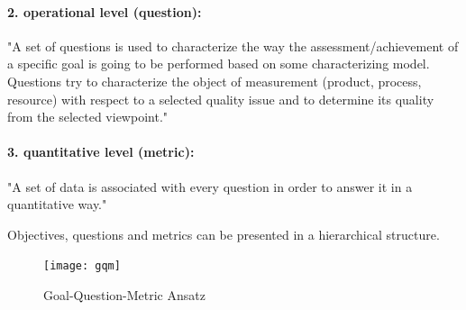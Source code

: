 \paragraph{2. operational level (question):}
"A set of questions is used to characterize the way
the assessment/achievement of a specific goal is going to be performed based on
some characterizing model. Questions try to characterize the object of
measurement (product, process, resource) with respect to a selected quality issue
and to determine its quality from the selected viewpoint." \cite[p. 3]{basili_goalquestionmetric_}

\paragraph{3. quantitative level (metric):}
"A set of data is associated with every question in order to answer it in a quantitative way."  \cite[p. 3]{basili_goalquestionmetric_}

Objectives, questions and metrics can be presented in a hierarchical structure.

\begin{figure}[H] %
	\centering
	\texttt{[image: gqm]}
	\caption[GQM tree stucture ]{Goal-Question-Metric Ansatz \cite[p. 3]{basili_goalquestionmetric_}} 
	\label{fig:gqm}
\end{figure}




